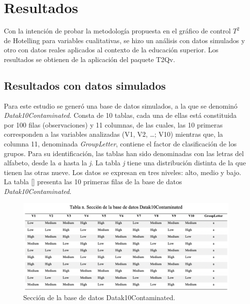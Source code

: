 \documentclass[water,article,submit,moreauthors,pdftex]{mdpi}
\begin{document}
\hypertarget{resultados}{%
\section{Resultados}\label{resultados}}

Con la intención de probar la metodología propuesta en el gráfico de
control \(T^2\) de Hotelling para variables cualitativas, se hizo un
análisis con datos simulados y otro con datos reales aplicados al
contexto de la educación superior. Los resultados se obtienen de la
aplicación del paquete T2Qv.

\hypertarget{resultados-con-datos-simulados}{%
\subsection{Resultados con datos
simulados}\label{resultados-con-datos-simulados}}

Para este estudio se generó una base de datos simulados, a la que se
denominó \emph{Datak10Contaminated}. Consta de 10 tablas, cada una de
ellas está constituida por 100 filas (observaciones) y 11 columnas, de
las cuales, las 10 primeras corresponden a las variables analizadas (V1,
V2, \ldots; V10) mientras que, la columna 11, denominada
\emph{GroupLetter}, contiene el factor de clasificación de los grupos.
Para su identificación, las tablas han sido denominadas con las letras
del alfabeto, desde la \emph{a} hasta la \emph{j}. La tabla \emph{j}
tiene una distribución distinta de la que tienen las otras nueve. Los
datos se expresan en tres niveles: alto, medio y bajo. La tabla \ref{}
presenta las 10 primeras filas de la base de datos
\emph{Datak10Contaminated}.

\begin{figure}[!ht]



\begin{center}\includegraphics[width=0.6\linewidth,]{tablabase} \end{center}

\caption{Sección de la base de datos Datak10Contaminated.}

\label{tab:tabladatos}
\end{figure}
\end{document}
